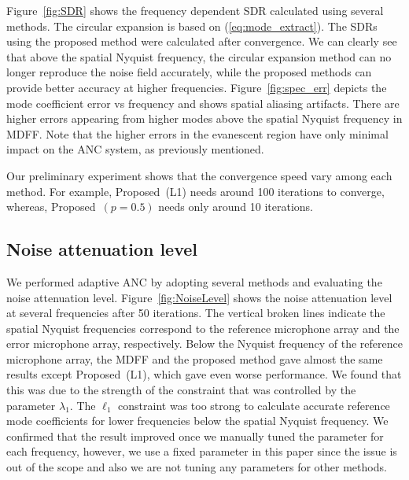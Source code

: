 \documentclass{article}
\begin{document}
Figure~\ref{fig:SDR} shows the frequency dependent SDR calculated using several methods.
The circular expansion is based on (\ref{eq:mode_extract}).
The SDRs using the proposed method were calculated after convergence.
We can clearly see that above the spatial Nyquist frequency,
the circular expansion method can no longer reproduce the  noise field accurately,
while the proposed methods can provide better accuracy at higher frequencies.
Figure~\ref{fig:spec_err} depicts the mode coefficient error vs frequency and shows spatial aliasing artifacts.
There are higher errors appearing from higher modes above the spatial Nyquist frequency in MDFF.
Note that the higher errors in the evanescent region have only minimal impact on the ANC system, as previously mentioned.

Our preliminary experiment shows that the convergence speed vary among each method.
For example, Proposed~(L1) needs around 100 iterations to converge, whereas, Proposed~$(p=0.5)$ needs only around 10 iterations.

\subsection{Noise attenuation level}
%
We performed adaptive ANC by adopting several methods and
evaluating the noise attenuation level.
%
Figure~\ref{fig:NoiseLevel} shows the noise attenuation level at several frequencies after 50 iterations.
The vertical broken lines indicate the spatial Nyquist frequencies correspond to
the reference microphone array and the error microphone array, respectively.
Below the Nyquist frequency of the reference microphone array,
the MDFF and the proposed method gave almost the same results
except Proposed~(L1), which gave even worse performance.
We found that this was due to the strength of the constraint
that was controlled by the parameter $\lambda_1$.
The $\ell_1$ constraint was too strong to calculate accurate reference mode coefficients
for lower frequencies below the spatial Nyquist frequency.
We confirmed that the result improved once we manually tuned the parameter
for each frequency, however,
we use a fixed parameter in this paper since the issue is out of the scope
and also we are not tuning any parameters for other methods.
\end{document}
